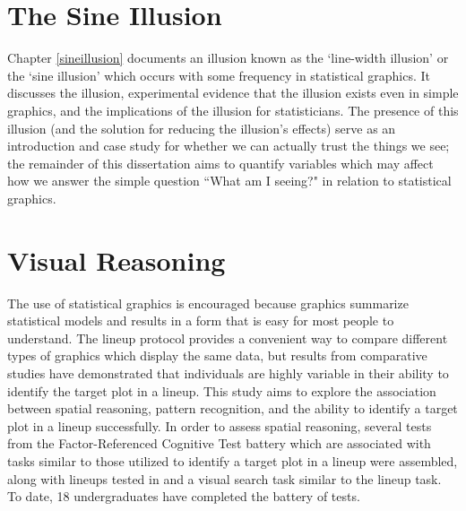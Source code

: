 \documentclass[11pt]{isuthesis}\usepackage[]{graphicx}\usepackage[]{color}
\begin{document}
\section{The Sine Illusion}
Chapter \ref{sineillusion} documents an illusion known as the `line-width illusion' or the `sine illusion' which occurs with some frequency in statistical graphics. It discusses the illusion, experimental evidence that the illusion exists even in simple graphics, and the implications of the illusion for statisticians. The presence of this illusion (and the solution for reducing the illusion's effects) serve as an introduction and case study for whether we can actually trust the things we see; the remainder of this dissertation aims to quantify variables which may affect how we answer the simple question ``What am I seeing?" in relation to statistical graphics. 

\section{Visual Reasoning}
The use of statistical graphics is encouraged because graphics summarize statistical models and results in a form that is easy for most people to understand. The lineup protocol provides a convenient way to compare different types of graphics which display the same data, but results from comparative studies\citep{hofmann2012graphical} have demonstrated that individuals are highly variable in their ability to identify the target plot in a lineup. This study aims to explore the association between spatial reasoning, pattern recognition, and the ability to identify a target plot in a lineup successfully. In order to assess spatial reasoning, several tests from the Factor-Referenced Cognitive Test battery \citep{ekstrom1976manual} which are associated with tasks similar to those utilized to identify a target plot in a lineup were assembled, along with lineups tested in \citep{hofmann2012graphical} and a visual search task similar to the lineup task. To date, 18 undergraduates have completed the battery of tests. 
\end{document}
